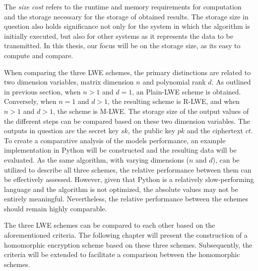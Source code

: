 The \textit{size cost} refers to the runtime and memory requirements for computation and the storage necessary for the storage of obtained results. The storage size in question also holds significance not only for the system in which the algorithm is initially executed, but also for other systems as it represents the data to be transmitted. In this thesis, our focus will be on the storage size, as its easy to compute and compare.

When comparing the three LWE schemes, the primary distinctions are related to two dimension variables, matrix dimension $n$ and polynomial rank $d$. As outlined in previous section, when $n>1$ and $d=1$, an Plain-LWE scheme is obtained. Conversely, when $n=1$ and $d>1$, the resulting scheme is R-LWE, and when $n>1$ and $d>1$, the scheme is M-LWE. The storage size of the output values of the different steps can be compared based on these two dimension variables. The outputs in question are the secret key $sk$, the public key $pk$ and the ciphertext $ct$. To create a comparative analysis of the models performance, an example implementation in Python will be constructed and the resulting data will be evaluated. As the same algorithm, with varying dimensions ($n$ and $d$), can be utilized to describe all three schemes, the relative performance between them can be effectively assessed. However, given that Python is a relatively slow-performing language and the algorithm is not optimized, the absolute values may not be entirely meaningful. Nevertheless, the relative performance between the schemes should remain highly comparable.

The three LWE schemes can be compared to each other based on the aforementioned criteria. The following chapter will present the construction of a homomorphic encryption scheme based on these three schemes. Subsequently, the criteria will be extended to facilitate a comparison between the homomorphic schemes.
